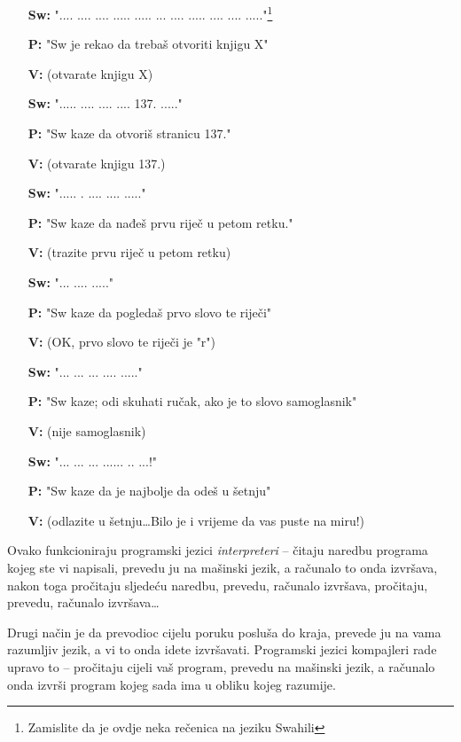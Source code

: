 	\begin{itemize}
		\item[\textbf{Sw:}] ".... .... .... ..... ..... ... .... ..... .... .... ....."\footnote{Zamislite da je ovdje neka rečenica na jeziku Swahili}
		\item[\textbf{P:}] "Sw je rekao da trebaš otvoriti knjigu X"
		\item[\textbf{V:}] (otvarate knjigu X)
		\item[\textbf{Sw:}] "..... .... .... .... 137. ....."
		\item[\textbf{P:}] "Sw kaze da otvoriš stranicu 137."
		\item[\textbf{V:}] (otvarate knjigu 137.)
		\item[\textbf{Sw:}] "..... . .... ....  ....."
		\item[\textbf{P:}] "Sw kaze da nađeš prvu riječ u petom retku."
		\item[\textbf{V:}] (trazite prvu riječ u petom retku)
		\item[\textbf{Sw:}] "... ....  ....."
		\item[\textbf{P:}] "Sw kaze da pogledaš prvo slovo te riječi"
		\item[\textbf{V:}] (OK, prvo slovo te riječi je "r")
		\item[\textbf{Sw:}] "...  ... ... ....  ....."
		\item[\textbf{P:}] "Sw kaze; odi skuhati ručak, ako je to slovo samoglasnik"
		\item[\textbf{V:}] (nije samoglasnik)
		\item[\textbf{Sw:}] "...  ... ... ......  .. ...!"
		\item[\textbf{P:}] "Sw kaze da je najbolje da odeš u šetnju"
		\item[\textbf{V:}] (odlazite u šetnju\dots Bilo je i vrijeme da vas puste na miru!)
	\end{itemize}

	Ovako funkcioniraju programski jezici \emph{interpreteri} -- čitaju naredbu
	programa kojeg ste vi napisali, prevedu ju na mašinski jezik, a računalo to
	onda izvršava, nakon toga pročitaju sljedeću naredbu, prevedu,
	računalo izvršava, pročitaju, prevedu, računalo izvršava\dots

	Drugi način je da prevodioc cijelu poruku posluša do kraja, prevede ju
	na vama razumljiv jezik, a vi to onda idete izvršavati. Programski jezici
	kompajleri rade upravo to -- pročitaju cijeli vaš program, prevedu na
	mašinski jezik, a računalo onda izvrši program kojeg sada
	ima u obliku kojeg razumije.

